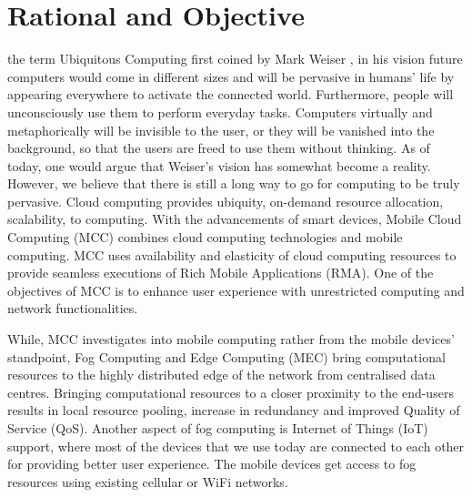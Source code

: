 \documentclass[12pt,journal,compsoc, onecolumn]{IEEEtran}
\begin{document}
\maketitle



\IEEEdisplaynotcompsoctitleabstractindextext



\IEEEpeerreviewmaketitle

\section{Rational and Objective}

 the term Ubiquitous Computing first coined by Mark Weiser \cite{Weiser:1999:CSC:329124.329126}, in his vision future computers would come in different sizes and will be pervasive in humans' life by appearing everywhere to activate the connected world. Furthermore, people will unconsciously use them to perform everyday tasks. Computers virtually and metaphorically will be invisible to the user, or they will be vanished into the background, so that the users are freed to use them without thinking. As of today, one would argue that Weiser's vision has somewhat become a reality. However, we believe that there is still a long way to go for computing to be truly pervasive. Cloud computing provides ubiquity, on-demand resource allocation, scalability, to computing. With the advancements of smart devices, Mobile Cloud Computing (MCC) combines cloud computing technologies and mobile computing. MCC uses availability and elasticity of cloud computing resources to provide seamless executions of Rich Mobile Applications (RMA). One of the objectives of MCC is to enhance user experience with unrestricted computing and network functionalities.
 
While, MCC investigates into mobile computing rather from the mobile devices' standpoint, Fog Computing \cite{bar2013fog} and Edge Computing (MEC) \cite{patel2014mobile} bring computational resources to the highly distributed edge of the network from centralised data centres. Bringing computational resources to a closer proximity to the end-users results in local resource pooling, increase in redundancy and improved Quality of Service (QoS). Another aspect of fog computing is Internet of Things (IoT) support, where most of the devices that we use today are connected to each other for providing better user experience. The mobile devices get access to fog resources using existing cellular or WiFi networks.
 
\end{document}
